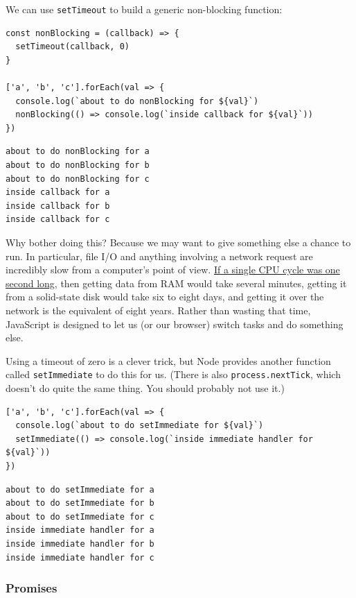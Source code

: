 We can use \texttt{setTimeout} to build a generic non-blocking function:

\begin{verbatim}
const nonBlocking = (callback) => {
  setTimeout(callback, 0)
}

['a', 'b', 'c'].forEach(val => {
  console.log(`about to do nonBlocking for ${val}`)
  nonBlocking(() => console.log(`inside callback for ${val}`))
})
\end{verbatim}

\begin{verbatim}
about to do nonBlocking for a
about to do nonBlocking for b
about to do nonBlocking for c
inside callback for a
inside callback for b
inside callback for c
\end{verbatim}

Why bother doing this? Because we may want to give something else a
chance to run. In particular, file I/O and anything involving a network
request are incredibly slow from a computer's point of view.
\href{http://exple.tive.org/blarg/2018/08/15/time-dilation/}{If a single
CPU cycle was one second long}, then getting data from RAM would take
several minutes, getting it from a solid-state disk would take six to
eight days, and getting it over the network is the equivalent of eight
years. Rather than wasting that time, JavaScript is designed to let us
(or our browser) switch tasks and do something else.

Using a timeout of zero is a clever trick, but Node provides another
function called \texttt{setImmediate} to do this for us. (There is also
\texttt{process.nextTick}, which doesn't do quite the same thing. You
should probably not use it.)

\begin{verbatim}
['a', 'b', 'c'].forEach(val => {
  console.log(`about to do setImmediate for ${val}`)
  setImmediate(() => console.log(`inside immediate handler for ${val}`))
})
\end{verbatim}

\begin{verbatim}
about to do setImmediate for a
about to do setImmediate for b
about to do setImmediate for c
inside immediate handler for a
inside immediate handler for b
inside immediate handler for c
\end{verbatim}

\subsubsection{Promises}\label{s:promises-promises}

